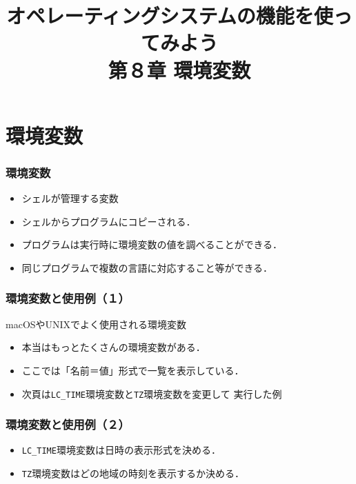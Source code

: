 \documentclass{beamer}                 %
\begin{document}
\title{オペレーティングシステムの機能を使ってみよう\\
第８章 環境変数}
\date{}

\begin{frame}
  \titlepage
\end{frame}

\section{環境変数}
\begin{frame}[fragile]
  \frametitle{環境変数}
  \begin{itemize}
  \item シェルが管理する変数
  \item シェルからプログラムにコピーされる．
  \item プログラムは実行時に環境変数の値を調べることができる．
  \item 同じプログラムで複数の言語に対応すること等ができる．
  \end{itemize}
\end{frame}

\begin{frame}[fragile]
  \frametitle{環境変数と使用例（１）}
  macOSやUNIXでよく使用される環境変数
  \begin{itemize}
  \item 本当はもっとたくさんの環境変数がある．
  \item ここでは「名前＝値」形式で一覧を表示している．
  \item 次頁は\texttt{LC\_TIME}環境変数と\texttt{TZ}環境変数を変更して
    実行した例
  \end{itemize}
\end{frame}

\begin{frame}[fragile]
  \frametitle{環境変数と使用例（２）}
  \begin{itemize}
  \item \texttt{LC\_TIME}環境変数は日時の表示形式を決める．
  \item \texttt{TZ}環境変数はどの地域の時刻を表示するか決める．
  \end{itemize}
\end{frame}
\end{document}
